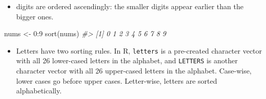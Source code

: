 \documentclass[
]{book}
\newenvironment{Shaded}{\begin{snugshade}}{\end{snugshade}}
\newcommand{\CommentTok}[1]{\textcolor[rgb]{0.56,0.35,0.01}{\textit{#1}}}
\newcommand{\DecValTok}[1]{\textcolor[rgb]{0.00,0.00,0.81}{#1}}
\newcommand{\FunctionTok}[1]{\textcolor[rgb]{0.00,0.00,0.00}{#1}}
\newcommand{\NormalTok}[1]{#1}
\newcommand{\OtherTok}[1]{\textcolor[rgb]{0.56,0.35,0.01}{#1}}
\newcommand{\SpecialCharTok}[1]{\textcolor[rgb]{0.00,0.00,0.00}{#1}}
\newcommand{\StringTok}[1]{\textcolor[rgb]{0.31,0.60,0.02}{#1}}
\providecommand{\tightlist}{%
  \setlength{\itemsep}{0pt}\setlength{\parskip}{0pt}}
\begin{document}
\begin{Shaded}
\end{Shaded}

\begin{itemize}
\tightlist
\item
  digits are ordered ascendingly: the smaller digits appear earlier than the bigger ones.
\end{itemize}

\begin{Shaded}
\begin{Highlighting}[]
\NormalTok{nums }\OtherTok{\textless{}{-}} \DecValTok{0}\SpecialCharTok{:}\DecValTok{9}
\FunctionTok{sort}\NormalTok{(nums)}
\CommentTok{\#\textgreater{}  [1] 0 1 2 3 4 5 6 7 8 9}
\end{Highlighting}
\end{Shaded}

\begin{itemize}
\tightlist
\item
  Letters have two sorting rules. In R, \texttt{letters} is a pre-created character vector with all 26 lower-cased letters in the alphabet, and \texttt{LETTERS} is another character vector with all 26 upper-cased letters in the alphabet. Case-wise, lower cases go before upper cases. Letter-wise, letters are sorted alphabetically.
\end{itemize}
\end{document}
